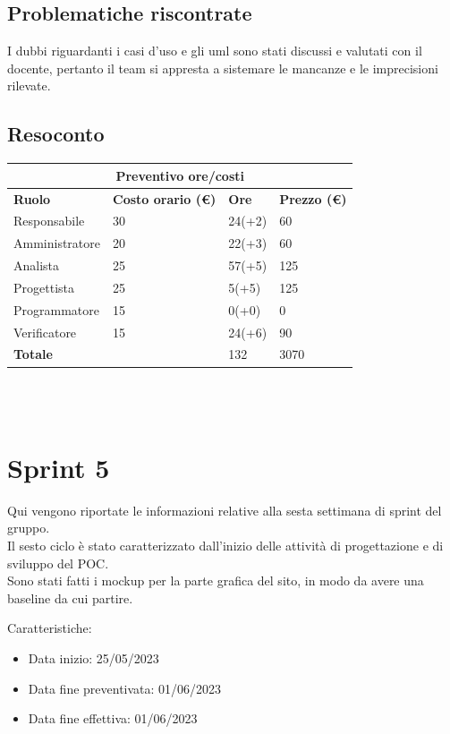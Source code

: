 \documentclass[12pt]{article}
\begin{document}
\subsection{Problematiche riscontrate}
I dubbi riguardanti i casi d'uso e gli uml sono stati discussi e valutati con il docente, pertanto il team si appresta a sistemare le mancanze e le imprecisioni rilevate.
\subsection{Resoconto}
\begin{center}
    \begin{tabularx}{\textwidth}{|X|X|X|X|}
        \hline
        \multicolumn{4}{|c|}{\textbf{Preventivo ore/costi}}\\
        \hline
        \hline
        \textbf{Ruolo} & \textbf{Costo orario (\euro)} & \textbf{Ore} & \textbf{Prezzo (\euro)}\\
        \hline
        Responsabile    & 30 & 24(+2)  & 60\\
        \hline
        Amministratore  & 20 & 22(+3)  & 60\\
        \hline
        Analista        & 25 & 57(+5)  & 125\\
        \hline
        Progettista     & 25 & 5(+5)  & 125\\
        \hline
        Programmatore   & 15 & 0(+0)  & 0\\
        \hline
        Verificatore    & 15 & 24(+6)  & 90\\
        \hline
        \hline
        \textbf{Totale} &    & 132 &  3070 \\
        \hline
    \end{tabularx}\\[8pt]
    \mbox{}\\
\end{center}

\section{Sprint 5}
Qui vengono riportate le informazioni relative alla sesta settimana di sprint del gruppo. \\
Il sesto ciclo è stato caratterizzato dall'inizio delle attività di progettazione e di sviluppo del POC. \\
Sono stati fatti i mockup per la parte grafica del sito, in modo da avere una baseline da cui partire.


Caratteristiche:
\begin{itemize}
    \item Data inizio: 25/05/2023
    \item Data fine preventivata: 01/06/2023
    \item Data fine effettiva: 01/06/2023
\end{itemize}
\end{document}
